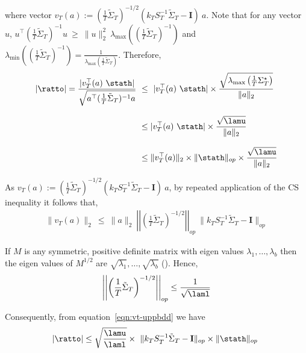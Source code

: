 \documentclass[11pt,letterpaper]{article}
\newcommand{\real}{\mathbb{R}}
\newcommand{\BT}{{\Sigma^\star_T}}
\newcommand{\Id}{\mathbf{I}}
\newcommand{\PT}{\tilde{\Sigma}_T}
\theoremstyle{plain}
\newtheorem{lemma}{Lemma}
\theoremstyle{definition}  %
\begin{document}
\noindent where vector $v_T(a) :=  (\frac{1}{T}\PT)^{-1/2} \left(k_T S_T^{-1} \PT-\Id  \right)\ a $. Note that for any vector $u$, $u^\top (\frac{1}{T}\PT)^{-1} u \ \geq \ \|u\|^2_2 \ \lambda_{\max} \left( (\frac{1}{T}\PT)^{-1} \right)$ and $\lambda_{\min} \left( (\frac{1}{T}\PT)^{-1} \right) = \frac{1}{\lambda_{\max} \left( \frac{1}{T}\PT \right)}$. Therefore,
\begin{align}\label{eqn:modrat-one}
\notag
     | \ratto | 
    = \frac{|v_T^\top (a) \ \stath|}{  \sqrt{a^\top (\frac{1}{T}\PT)^{-1}  a}} 
    \  &\leq \  |v_T^\top (a) \ \stath| \times \frac{\sqrt{\lambda_{\max} \left( \frac{1}{T} \BT \right)}} {\|a\|_2} \\[8pt]\notag
    & \leq |v_T^\top (a) \ \stath| \times \frac{\sqrt{\lamu}} {\|a\|_2}\\[8pt]
    &\leq \| v_T^\top (a)\|_2 \times \| \stath\|_{op} \times \frac{\sqrt{\lamu}} {\|a\|_2}
\end{align}

\noindent As $v_T(a) :=  (\frac{1}{T}\PT)^{-1/2} \left(k_T S_T^{-1} \PT-\Id  \right)\ a $, by repeated application of the CS inequality it follows that,
\begin{align}\label{eqn:vt-uppbdd}
   \|v_T(a)\|_2 \ \leq \ \|a\|_2 \ \left| \left|\left( \frac{1}{T} \PT \right)^{-1/2} \right| \right|_{op}
    \ \| k_T S_T^{-1} \PT - \Id  \|_{op} 
\end{align}


\noindent If $M$ is any symmetric, positive definite matrix with eigen values $\lambda_1,\ldots,\lambda_b$ then the eigen values of $M^{1/2}$ are $\sqrt{\lambda_1},\ldots,\sqrt{\lambda_b}$ (\citet{rao2000linear}). Hence,
\begin{align*}
    \left| \left|\left( \frac{1}{T} \PT \right)^{-1/2} \right| \right|_{op} \leq \frac{1}{\sqrt{\laml}}
\end{align*}

\noindent Consequently, from equation~\eqref{eqn:vt-uppbdd} we have
\begin{align}\label{eqn:rt-bddtwo}
    | \ratto | \leq  \sqrt{\frac{\lamu}{\laml}} \times
    \ \| k_T S_T^{-1} \PT - \Id  \|_{op}  \times \| \stath\|_{op} \
\end{align}
\end{document}
